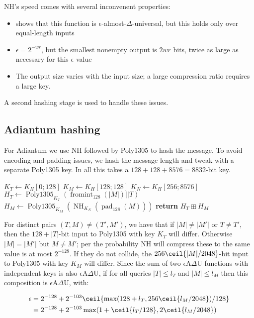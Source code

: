 \documentclass[journal=tosc,preprint,floatrow,submission]{iacrtrans}
\DeclareMathOperator{\Polydjb}{Poly1305}
\DeclareMathOperator{\NH}{NH}
\DeclareMathOperator{\fromint}{fromint}
\DeclareMathOperator{\pad}{pad}
\begin{document}
NH's speed comes with several inconvenent properties:
\begin{itemize}
    \item \cite{nh} shows that this function is $\epsilon$-almost-$\Delta$-universal, but this
        holds only over equal-length inputs
    \item $\epsilon = 2^{-wr}$, but the smallest nonempty output is $2wr$ bits, twice as large
        as necessary for this $\epsilon$ value
    \item The output size varies with the input size; a large compression ratio requires a large key.
\end{itemize}
A second hashing stage is used to handle these issues.

\subsection{Adiantum hashing}

For Adiantum we use NH followed by Poly1305 to hash the message.
To avoid encoding and padding issues, we hash the message length and tweak with
a separate Poly1305 key.
In all this takes a $128 + 128 + 8576 = 8832$-bit key.

\begin{algorithmic}[0]
    \State $K_T \gets K_H[0;128]$
    \State $K_M \gets K_H[128;128]$
    \State $K_N \gets K_H[256;8576]$
    \State $H_T \gets \Polydjb_{K_T}(\fromint_{128}(|M|) || T)$
    \State $H_M \gets \Polydjb_{K_M}(\NH_{K_N}(\pad_{128}(M)))$
    \State \textbf{return} $H_T \boxplus H_M$
    \EndProcedure
\end{algorithmic}

For distinct pairs $(T,M) \neq (T', M')$, we have that if $|M| \neq |M'|$ or $T \neq T'$,
then the $128 + |T|$-bit input to Poly1305 with key $K_T$ will differ.
Otherwise $|M| = |M'|$ but $M \neq M'$;
per \cite{nh} the probability NH will compress these to the same value is at most
$2^{-128}$. If they do not collide, the $256\ceil{|M|/2048}$-bit input to Poly1305 with key $K_M$
will differ. Since the sum of two $\epsilon$A$\Delta$U functions with independent keys is also
$\epsilon$A$\Delta$U, if for all queries $|T| \leq l_T$ and $|M| \leq l_M$ then
this composition is  $\epsilon$A$\Delta$U, with:

\begin{align*}
\epsilon &= 2^{-128} + 2^{-103}\ceil{\max(128 + l_T, 256\ceil{l_M/2048})/128}  \\
&= 2^{-128} + 2^{-103}\max(1 + \ceil{l_T/128}, 2\ceil{l_M/2048})
\end{align*}
\end{document}
